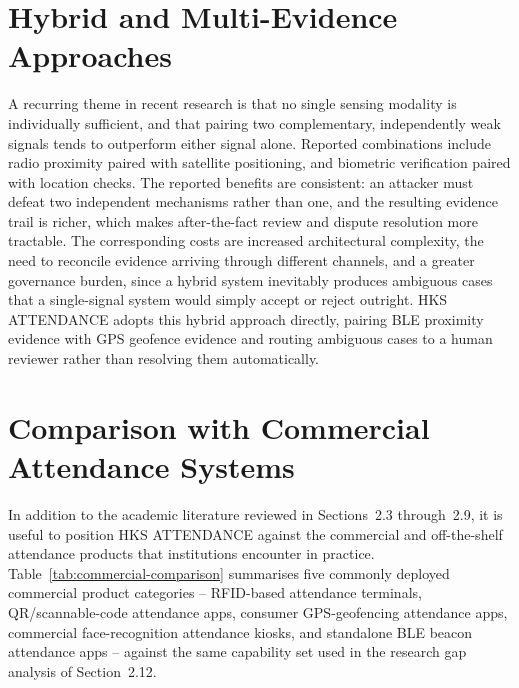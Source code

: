 \documentclass[12pt, a4paper, oneside]{report}
\begin{document}
\section{Hybrid and Multi-Evidence Approaches}

A recurring theme in recent research is that no single sensing modality is individually sufficient, and that pairing two complementary, independently weak signals tends to outperform either signal alone. Reported combinations include radio proximity paired with satellite positioning, and biometric verification paired with location checks. The reported benefits are consistent: an attacker must defeat two independent mechanisms rather than one, and the resulting evidence trail is richer, which makes after-the-fact review and dispute resolution more tractable. The corresponding costs are increased architectural complexity, the need to reconcile evidence arriving through different channels, and a greater governance burden, since a hybrid system inevitably produces ambiguous cases that a single-signal system would simply accept or reject outright. HKS ATTENDANCE adopts this hybrid approach directly, pairing BLE proximity evidence with GPS geofence evidence and routing ambiguous cases to a human reviewer rather than resolving them automatically.

\section{Comparison with Commercial Attendance Systems}
\label{sec:commercial-comparison}

In addition to the academic literature reviewed in Sections~2.3 through~2.9, it is useful to position HKS ATTENDANCE against the commercial and off-the-shelf attendance products that institutions encounter in practice. Table~\ref{tab:commercial-comparison} summarises five commonly deployed commercial product categories -- RFID-based attendance terminals, QR/scannable-code attendance apps, consumer GPS-geofencing attendance apps, commercial face-recognition attendance kiosks, and standalone BLE beacon attendance apps -- against the same capability set used in the research gap analysis of Section~2.12.
\end{document}
